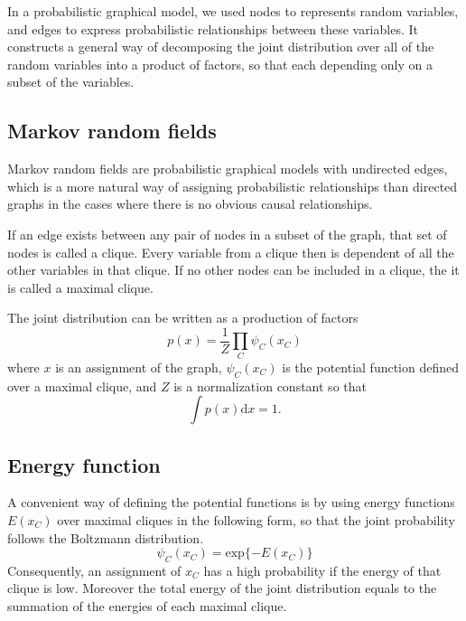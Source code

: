 In a probabilistic graphical model, we used nodes to represents random variables, and edges to express probabilistic relationships between these variables. It constructs a general way of decomposing the joint distribution over all of the random variables into a product of factors, so that each depending only on a subset of the variables.

\subsection{Markov random fields}
\label{sec:Markov random fields}
Markov random fields are probabilistic graphical models with undirected edges, which is a more natural way of assigning probabilistic relationships than directed graphs in the cases where there is no obvious causal relationships.

If an edge exists between any pair of nodes in a subset of the graph, that set of nodes is called a clique. Every variable from a clique then is dependent of all the other variables in that clique. If no other nodes can be included in a clique, the it is called a maximal clique. 

The joint distribution can be written as a production of factors
\begin{equation}
	p(x) = \frac{1}{Z}\prod\limits_{C}\psi_C({x_C})
\end{equation}
where $x$ is an assignment of the graph, $\psi_C({x_C})$ is the potential function defined over a maximal clique, and $Z$ is a normalization constant so that 
\begin{equation}
	\int p(x)\mathrm{d}x = 1.
\end{equation}

\subsection{Energy function}
\label{sec:Energy function}

A convenient way of defining the potential functions is by using energy functions $E({x_C})$ over maximal cliques in the following form, so that the joint probability follows the Boltzmann distribution. 
\begin{equation}
\label{energy}
	\psi_C({x_C}) = \mathrm{exp}\{-E({x_C})\}
\end{equation}
Consequently, an assignment of $x_C$ has a high probability if the energy of that clique is low. Moreover the total energy of the joint distribution equals to the summation of the energies of each maximal clique.

